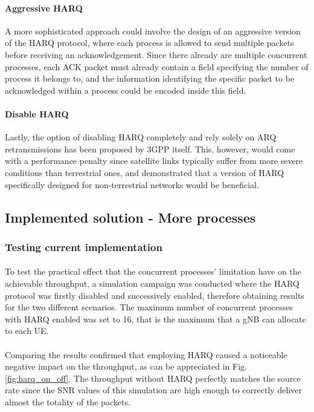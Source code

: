 \paragraph{Aggressive HARQ}
A more sophisticated approach could involve the design of an aggressive version of the \ac{HARQ} protocol, where each process is allowed to send multiple packets before receiving an acknowledgement. Since there already are multiple concurrent processes, each \ac{ACK} packet must already contain a field specifying the number of process it belongs to, and the information identifying the specific packet to be acknowledged within a process could be encoded inside this field.
\paragraph{Disable \ac{HARQ}}
Lastly, the option of disabling \ac{HARQ} completely and rely solely on \ac{ARQ} retransmissions has been proposed by 3GPP itself\cite{hybrid-arq-schemes-muk}. This, however, would come with a performance penalty since satellite links typically suffer from more severe conditions than terrestrial ones, and \cite{5g-beyond-5g-ntn-trends-vanellicoralli} demonstrated that a version of \ac{HARQ} specifically designed for non-terrestrial networks would be beneficial.

\subsection{Implemented solution - More processes}
\subsubsection{Testing current implementation}
\paragraph{}
To test the practical effect that the concurrent processes' limitation have on the achievable throughput, a simulation campaign was conducted where the \ac{HARQ} protocol was firstly disabled and successively enabled, therefore obtaining results for the two different scenarios. The maximum number of concurrent processes with \ac{HARQ} enabled was set to 16, that is the maximum that a \ac{gNB} can allocate to each \ac{UE}.

\paragraph{}
Comparing the results confirmed that employing \ac{HARQ} caused a noticeable negative impact on the throughput, as can be appreciated in Fig. \ref{fig:harq_on_off}. The throughput without \ac{HARQ} perfectly matches the source rate since the \ac{SNR} values of this simulation are high enough to correctly deliver almost the totality of the packets. 

